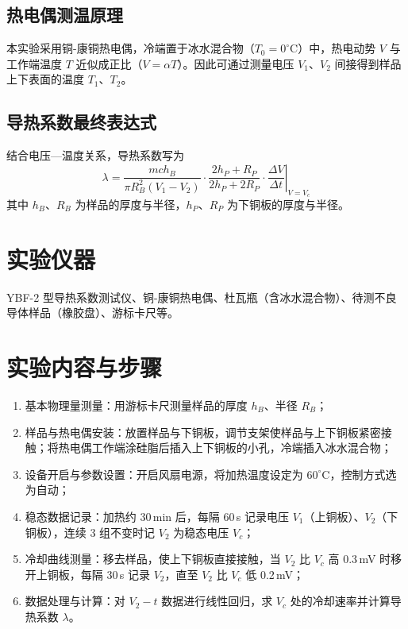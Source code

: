 \documentclass[12pt]{ctexart}
\begin{document}
\subsection{热电偶测温原理}
本实验采用铜-康铜热电偶，冷端置于冰水混合物（$T_0=0^{\circ}\mathrm{C}$）中，热电动势 $V$ 与工作端温度 $T$ 近似成正比（$V=\alpha T$）。因此可通过测量电压 $V_1、V_2$ 间接得到样品上下表面的温度 $T_1、T_2$。

\subsection{导热系数最终表达式}
结合电压—温度关系，导热系数写为
\begin{equation}
\lambda = \frac{m c h_B}{\pi R_B^2 (V_1-V_2)} \cdot \frac{2h_P+R_P}{2h_P+2R_P} \cdot \left. \frac{\Delta V}{\Delta t} \right|_{V=V_c}
\end{equation}
其中 $h_B、R_B$ 为样品的厚度与半径，$h_P、R_P$ 为下铜板的厚度与半径。

\section{实验仪器}
YBF-2 型导热系数测试仪、铜-康铜热电偶、杜瓦瓶（含冰水混合物）、待测不良导体样品（橡胶盘）、游标卡尺等。

\section{实验内容与步骤}
\begin{enumerate}
\item 基本物理量测量：用游标卡尺测量样品的厚度 $h_B$、半径 $R_B$；
\item 样品与热电偶安装：放置样品与下铜板，调节支架使样品与上下铜板紧密接触；将热电偶工作端涂硅脂后插入上下铜板的小孔，冷端插入冰水混合物；
\item 设备开启与参数设置：开启风扇电源，将加热温度设定为 $60^{\circ}\mathrm{C}$，控制方式选为自动；
\item 稳态数据记录：加热约 30\,min 后，每隔 60\,s 记录电压 $V_1$（上铜板）、$V_2$（下铜板），连续 3 组不变时记 $V_2$ 为稳态电压 $V_c$；
\item 冷却曲线测量：移去样品，使上下铜板直接接触，当 $V_2$ 比 $V_c$ 高 0.3\,mV 时移开上铜板，每隔 30\,s 记录 $V_2$，直至 $V_2$ 比 $V_c$ 低 0.2\,mV；
\item 数据处理与计算：对 $V_2-t$ 数据进行线性回归，求 $V_c$ 处的冷却速率并计算导热系数 $\lambda$。
\end{enumerate}
\end{document}

